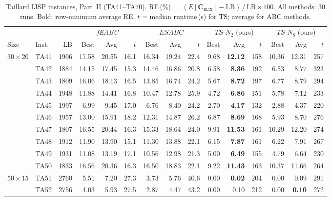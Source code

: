 \documentclass[a4paper,11pt]{article}
\begin{document}
\begin{table}[htbp]
\centering\small\setlength{\tabcolsep}{3pt}
\caption{Taillard IJSP instances, Part~II (TA41--TA70).
RE\,(\%) $= (E[\mathbf{C}_{\max}]-\mathrm{LB})\,/\,\mathrm{LB}\times100$.
All methods: 30 runs. Bold: row-minimum average RE.
$t$ = median runtime\,(s) for TS; average for ABC methods.}
\label{tab:supp_taillard_ii}
\begin{tabular}{ll r | rr r | rr r | rr r | rr r}
\hline
 & & & \multicolumn{3}{c|}{\emph{fEABC} \cite{DiazFEABC2023}} &
         \multicolumn{3}{c|}{$ESABC$ \cite{DiazICAE2023}} &
         \multicolumn{3}{c|}{$TS$-$N_2$ (ours)} &
         \multicolumn{3}{c}{$TS$-$N_8$ (ours)} \\
Size & Inst. & LB & Best & Avg & $t$ & Best & Avg & $t$ & Best & Avg & $t$ & Best & Avg & $t$ \\
\hline
$30\times20$ & TA41 & 1906 & 17.58 & 20.55 & 16.1 & 16.34 & 19.24 & 22.4 & 9.68 & \textbf{12.12} & 158 & 10.36 & 12.31 & 257 \\
 & TA42 & 1884 & 14.15 & 17.45 & 15.3 & 14.46 & 16.86 & 20.8 & 6.58 & \textbf{8.36} & 192 & 6.53 & 8.77 & 323 \\
 & TA43 & 1809 & 16.06 & 18.13 & 16.5 & 13.85 & 16.74 & 24.2 & 5.67 & \textbf{8.72} & 197 & 6.77 & 8.79 & 294 \\
 & TA44 & 1948 & 11.88 & 14.41 & 16.8 & 10.47 & 12.78 & 25.9 & 4.72 & \textbf{6.86} & 151 & 5.78 & 7.12 & 233 \\
 & TA45 & 1997 & 6.99 & 9.45 & 17.0 & 6.76 & 8.40 & 24.2 & 2.70 & \textbf{4.17} & 132 & 2.88 & 4.37 & 220 \\
 & TA46 & 1957 & 13.00 & 15.91 & 18.2 & 12.31 & 14.87 & 26.2 & 6.87 & \textbf{8.69} & 168 & 5.93 & 8.70 & 276 \\
 & TA47 & 1807 & 16.55 & 20.44 & 16.3 & 15.33 & 18.64 & 24.0 & 9.91 & \textbf{11.53} & 161 & 10.29 & 12.20 & 274 \\
 & TA48 & 1912 & 11.90 & 13.90 & 15.1 & 11.30 & 13.88 & 22.1 & 6.15 & \textbf{7.87} & 161 & 6.22 & 7.91 & 267 \\
 & TA49 & 1931 & 11.08 & 13.19 & 17.1 & 10.56 & 12.98 & 21.3 & 5.00 & \textbf{6.49} & 155 & 4.79 & 6.64 & 230 \\
 & TA50 & 1833 & 16.56 & 20.36 & 16.3 & 16.50 & 18.83 & 22.1 & 9.22 & \textbf{11.43} & 163 & 10.37 & 11.66 & 264 \\
\hline
$50\times15$ & TA51 & 2760 & 5.51 & 7.20 & 27.3 & 3.73 & 5.76 & 40.6 & 0.00 & \textbf{0.02} & 204 & 0.00 & 0.09 & 291 \\
 & TA52 & 2756 & 4.03 & 5.93 & 27.5 & 2.87 & 4.47 & 43.2 & 0.00 & 0.10 & 212 & 0.00 & \textbf{0.10} & 272 \\

\end{tabular}
\end{table}
\end{document}
